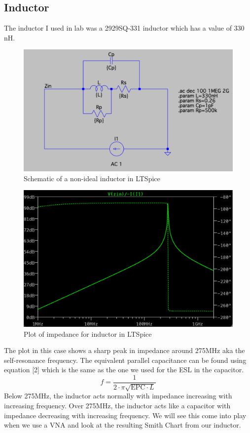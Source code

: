 \documentclass[12pt]{article}
\begin{document}
\subsection*{Inductor}
The inductor I used in lab was a 2929SQ-331 inductor which has a value of 330 nH.  
\begin{figure}[h]
\centering
\includegraphics[width=12cm]{assets/ind_schematic.png}
\caption{Schematic of a non-ideal inductor in LTSpice}
\end{figure}
\begin{figure}[h]
\centering
\includegraphics[width=12cm]{assets/ind_impedance.png}
\caption{Plot of impedance for inductor in LTSpice}
\end{figure}
The plot in this case shows a sharp peak in impedance around 275MHz aka the self-resonance frequency. The equivalent parallel capacitance can be found using equation [2] which is the same as the one we used for the ESL in the capacitor. 
\begin{equation}
     f = \frac{1}{2\cdot\pi\sqrt{\text{EPC}\cdot L}}
\end{equation}
Below 275MHz, the inductor acts normally with impedance increasing with increasing frequency. Over 275MHz, the inductor acts like a capacitor with impedance decreasing with increasing frequency. We will see this come into play when we use a VNA and look at the resulting Smith Chart from our inductor. 
\clearpage
\end{document}
